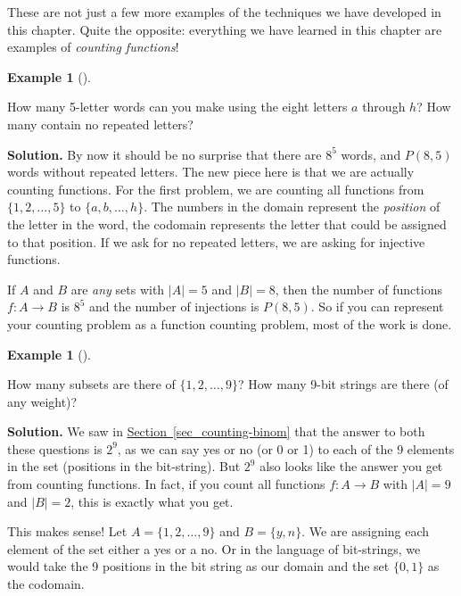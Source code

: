 \documentclass[10pt,]{book}
\theoremstyle{plain}
\theoremstyle{definition}
\newtheorem{example}[theorem]{Example}
\theoremstyle{definition}
\theoremstyle{definition}
\numberwithin{equation}{chapter}
\begin{document}
    These are not just a few more examples of the techniques we have developed in this chapter. Quite the opposite: everything we have learned in this chapter are examples of \emph{counting functions}!
\begin{example}[]\label{example-55}

    How many 5-letter words can you make using the eight letters \(a\) through \(h\)? How many contain no repeated letters?
\par\medskip\noindent%
\textbf{Solution.}\quad
    By now it should be no surprise that there are \(8^5\) words, and \(P(8,5)\) words without repeated letters. The new piece here is that we are actually counting functions. For the first problem, we are counting all functions from \(\{1,2,\ldots, 5\}\) to \(\{a,b,\ldots, h\}\). The numbers in the domain represent the \emph{position} of the letter in the word, the codomain represents the letter that could be assigned to that position. If we ask for no repeated letters, we are asking for injective functions.
\par

    If \(A\) and \(B\) are \emph{any} sets with \(|A| = 5\) and \(|B| = 8\), then the number of functions \(f: A \to B\) is \(8^5\) and the number of injections is \(P(8,5)\). So if you can represent your counting problem as a function counting problem, most of the work is done.
\end{example}
\begin{example}[]\label{example-56}

    How many subsets are there of \(\{1,2,\ldots, 9\}\)? How many 9-bit strings are there (of any weight)?
\par\medskip\noindent%
\textbf{Solution.}\quad
    We saw in \hyperref[sec_counting-binom]{Section~\ref{sec_counting-binom}} that the answer to both these questions is \(2^9\), as we can say yes or no (or 0 or 1) to each of the 9 elements in the set (positions in the bit-string). But \(2^9\) also looks like the answer you get from counting functions. In fact, if you count all functions \(f: A \to B\) with \(|A| = 9\) and \(|B| = 2\), this is exactly what you get.
\par

    This makes sense! Let \(A = \{1,2,\ldots, 9\}\) and \(B = \{y, n\}\). We are assigning each element of the set either a yes or a no. Or in the language of bit-strings, we would take the 9 positions in the bit string as our domain and the set \(\{0,1\}\) as the codomain.
\end{example}
\par
\end{document}
